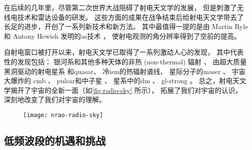 在后续的几年里，尽管第二次世界大战阻碍了射电天文学的发展，
但是刺激了无线电技术和雷达设备的研发。
这些方面的成果在战争结束后给射电天文学带去了长足的进步，开创了一系列新技术和新方法。
其中最值得一提的是由 Martin Ryle 和 Antony Hewish 发明的\ac{as}技术 \cite{ryle1960}，
使射电观测的角分辨率得到了空前的提高。

自射电窗口被打开以来，射电天文学已取得了一系列激动人心的发现，
其中代表性的发现包括：
银河系和其他多种天体的非热 (non-thermal) 辐射 \cite{reber1940}、
由超大质量黑洞驱动的射电星系\cite{baade1954}
和\ac{quasar}\cite{hazard1963,schmidt1963}、
冷\ac{ism}的热辐射谱线、
星际分子的\ac{maser} \cite{weaver1965}、
宇宙大爆炸的 \ac{cmb} \cite{penzias1965}、
\ac{pulsar}和中子星 \cite{hewish1968}、
星系中的\ac{dm} \cite{roberts1975}、
\ac{gl-strong} \cite{walsh1979}。
总之，射电天文学揭开了宇宙的全新一面（如\autoref{fig:radio-sky} 所示），
拓展了我们对宇宙的认识，深刻地改变了我们对宇宙的理解。

\begin{figure}[htp]
  \centering
  \texttt{[image: nrao-radio-sky]}
  \label{fig:radio-sky}
\end{figure}

\subsection{低频波段的机遇和挑战}

